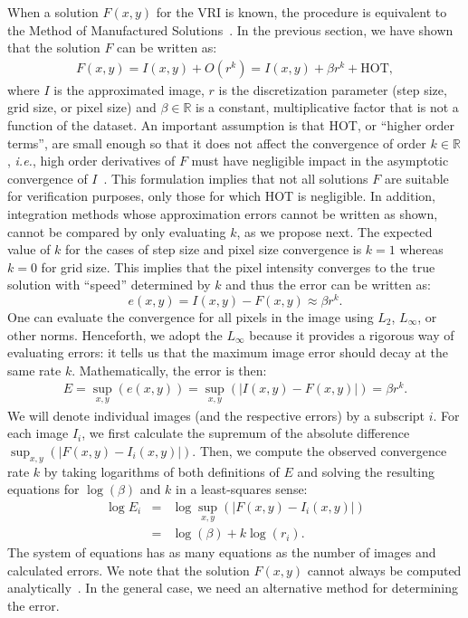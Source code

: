 When a solution $F(x,y)$ for the VRI is known, the procedure is equivalent
to the Method of Manufactured Solutions~\cite{babuska04}.  In the
previous section, we have shown that the 
solution $F$ can be written as:
\begin{eqnarray}
F(x,y) = I(x,y) + O(r^k) = I(x,y) + \beta r^k + \text{HOT},
\end{eqnarray}
where $I$ is the approximated image, $r$ is the discretization parameter (step size, grid size, or
pixel size) and $\beta \in \mathbb{R}$ is a constant, multiplicative
factor that is not a function of the dataset. An important assumption
is that HOT, or ``higher order terms'', are small enough so that it
does not affect the convergence of order $k \in \mathbb{R}$, {\em i.e.}, high order
derivatives of $F$ must have negligible impact in the asymptotic
convergence of $I$~\cite{Roy2005}. 
This formulation implies that not all solutions
$F$ are suitable for verification purposes, only those for which HOT is
negligible. In addition, integration methods whose approximation errors 
cannot be written as shown,
cannot be compared by only evaluating $k$, as we propose next. 
The expected value of $k$ for the cases of step size and pixel size 
convergence is $k = 1$ whereas $k = 0$ for grid size. 
This implies that the pixel intensity
converges to the true solution with ``speed'' determined by $k$ and
thus the error can be written as:
\begin{equation}
e(x,y) = I(x,y) - F(x,y) \approx \beta r^k.
\end{equation}
One can evaluate the convergence for all pixels in the image using
$L_2$, $L_\infty$, or other norms. Henceforth, we adopt the $L_\infty$
because it provides a rigorous way of evaluating errors: it tells us
that the maximum image error should decay at the same rate
$k$. Mathematically, the error is then:
\begin{eqnarray}
E = \sup_{x,y}(e(x,y)) = \sup_{x,y}(|I(x,y) - F(x,y)|) = \beta r^k.
\end{eqnarray}
We will denote individual images (and the respective errors) by a
subscript $i$.  For each image $I_i$, we first calculate the supremum
of the absolute difference $\sup_{x,y}\left( |F(x,y) - I_i(x,y)|
\right)$.  Then, we compute the observed convergence rate $k$ by
taking logarithms of both definitions of $E$ and solving the resulting
equations for $\log(\beta)$ and $k$ in a least-squares sense:
\begin{eqnarray}
\log E_i &=& \log \sup_{x,y}\left( |F(x,y) - I_i(x,y)|
\right)\nonumber\\
         &=& \log(\beta) + k \log(r_i).
\label{eq:known-solution}
\end{eqnarray}
The system of equations has as many equations as the number of images
and calculated errors.  We note that the solution $F(x,y)$
cannot always be computed analytically~\cite{Max95}. In the general
case, we need an alternative method for determining the error.


